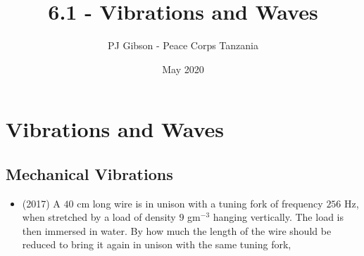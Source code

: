 \documentclass{article}
\title{6.1 - Vibrations and Waves}
\author{PJ Gibson - Peace Corps Tanzania}
\date{May 2020}
\begin{document}
\maketitle


\section{Vibrations and Waves}

\subsection{Mechanical Vibrations}
\begin{itemize}
\item (2017)  A $ 40$ cm long wire is in unison with a tuning fork of frequency $ 256$ Hz, when stretched by a load of density $ 9$ gm$ ^{-3}$ hanging vertically. The load is then immersed in water. By how much the length of the wire should be reduced to bring it again in unison with the same tuning fork,
\end{itemize}
\end{document}
